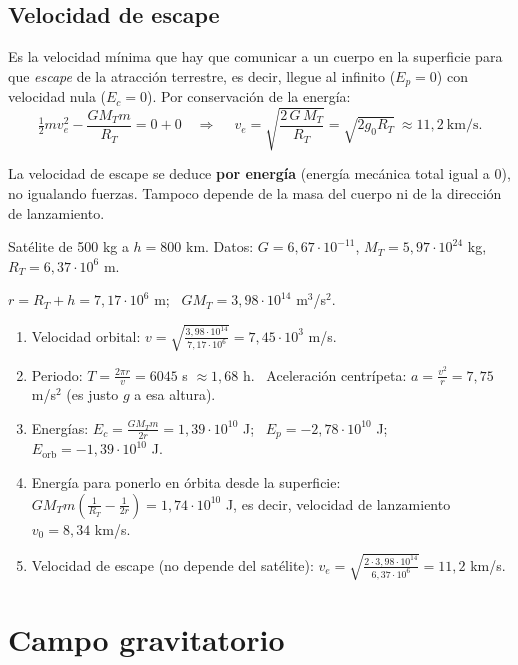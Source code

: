 \documentclass[11pt,a4paper]{article}
\begin{document}
\subsection{Velocidad de escape}
Es la velocidad mínima que hay que comunicar a un cuerpo en la superficie para que \emph{escape} de la atracción terrestre, es decir, llegue al infinito ($E_p=0$) con velocidad nula ($E_c=0$). Por conservación de la energía:
\[
\tfrac12mv_e^2-\frac{GM_Tm}{R_T}=0+0\quad\Longrightarrow\quad\boxed{\ v_e=\sqrt{\frac{2\,G\,M_T}{R_T}}=\sqrt{2g_0R_T}\ }\approx11{,}2\ \mathrm{km/s}.
\]
\begin{ojo}
La velocidad de escape se deduce \textbf{por energía} (energía mecánica total igual a 0), no igualando fuerzas. Tampoco depende de la masa del cuerpo ni de la dirección de lanzamiento.
\end{ojo}

\begin{ejemplo}[title={Ejemplo completo: satélite a 800 km}]
Satélite de 500 kg a $h=800$ km. Datos: $G=6{,}67\cdot10^{-11}$, $M_T=5{,}97\cdot10^{24}$ kg, $R_T=6{,}37\cdot10^6$ m.

$r=R_T+h=7{,}17\cdot10^6$ m; \ $GM_T=3{,}98\cdot10^{14}$ m$^3$/s$^2$.
\begin{enumerate}[itemsep=2pt]
  \item Velocidad orbital: $v=\sqrt{\frac{3{,}98\cdot10^{14}}{7{,}17\cdot10^6}}=7{,}45\cdot10^3$ m/s.
  \item Periodo: $T=\frac{2\pi r}{v}=6045$ s $\approx1{,}68$ h. \ Aceleración centrípeta: $a=\frac{v^2}{r}=7{,}75$ m/s$^2$ (es justo $g$ a esa altura).
  \item Energías: $E_c=\frac{GM_Tm}{2r}=1{,}39\cdot10^{10}$ J; \ $E_p=-2{,}78\cdot10^{10}$ J; \ $E_{\text{orb}}=-1{,}39\cdot10^{10}$ J.
  \item Energía para ponerlo en órbita desde la superficie: $GM_Tm\left(\frac1{R_T}-\frac1{2r}\right)=1{,}74\cdot10^{10}$ J, es decir, velocidad de lanzamiento $v_0=8{,}34$ km/s.
  \item Velocidad de escape (no depende del satélite): $v_e=\sqrt{\frac{2\cdot3{,}98\cdot10^{14}}{6{,}37\cdot10^6}}=11{,}2$ km/s.
\end{enumerate}
\end{ejemplo}

\section{Campo gravitatorio}
\end{document}
